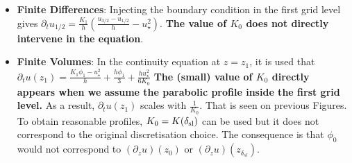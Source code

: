 \begin{itemize}
		\item \textbf{Finite Differences}:
Injecting the boundary condition in the first grid level gives
$\partial_t u_{1/2} = \frac{K_1}{h}\left(\frac{u_{3/2} - u_{1/2}}{h}
 - u_\star^2
\right)$.
\textbf{The value of $K_0$ does not directly intervene in the equation}.

\item \textbf{Finite Volumes}:
In the continuity equation at $z=z_1$, it is used that
$\partial_t u(z_1) = \frac{K_1 \phi_1 - u_\star^2}{h}
+ \frac{h \phi_1}{3} + \frac{h u_\star^2}{6 K_0}$
\textbf{The (small) value of $K_0$ directly appears when we assume the
parabolic profile inside the first grid level.}
As a result, $\partial_t u(z_1)$ scales with $\frac{1}{K_0}$.
That is seen
on previous Figures.
To obtain reasonable profiles, $K_0=K(\delta_{\rm sl})$ can be used
but it does not correspond to the original discretisation choice.
The consequence is that $\phi_0$ would not correspond
to $(\partial_z u)(z_0)$ or $(\partial_z u)(z_{\delta_{sl}})$.
\end{itemize}

